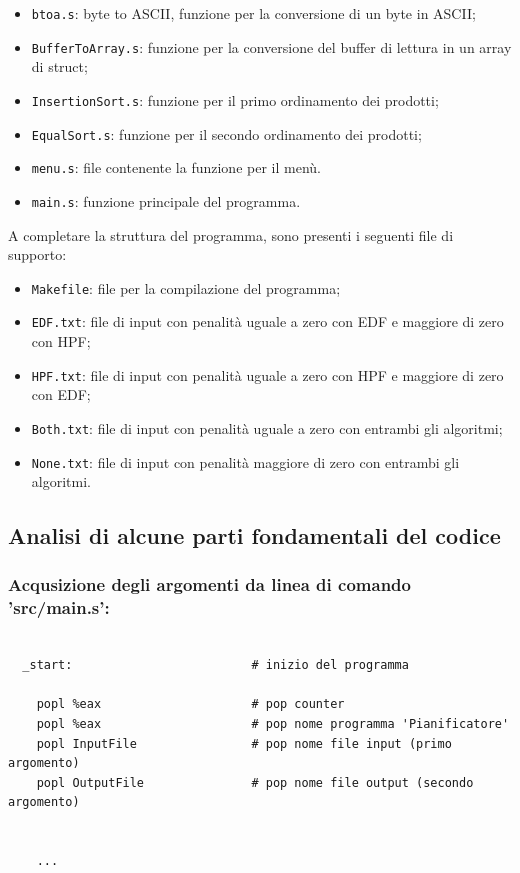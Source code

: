 \documentclass[a4paper]{report}
\begin{document}
\begin{itemize}
  \item \texttt{btoa.s}: byte to ASCII, funzione per la conversione di un byte in ASCII;
  \item \texttt{BufferToArray.s}: funzione per la conversione del buffer di lettura in un array di struct;
  \item \texttt{InsertionSort.s}: funzione per il primo ordinamento dei prodotti;
  \item \texttt{EqualSort.s}: funzione per il secondo ordinamento dei prodotti;
  \item \texttt{menu.s}: file contenente la funzione per il menù.
  \item \texttt{main.s}: funzione principale del programma.
\end{itemize}

A completare la struttura del programma, sono presenti i seguenti file di supporto:
\begin{itemize}
  \item \texttt{Makefile}: file per la compilazione del programma;
  \item \texttt{EDF.txt}: file di input con penalità uguale a zero con EDF e maggiore di zero con HPF;
  \item \texttt{HPF.txt}: file di input con penalità uguale a zero con HPF e maggiore di zero con EDF;
  \item \texttt{Both.txt}: file di input con penalità uguale a zero con entrambi gli algoritmi;
  \item \texttt{None.txt}: file di input con penalità maggiore di zero con entrambi gli algoritmi.
\end{itemize}

\subsection{Analisi di alcune parti fondamentali del codice}

\subsubsection{Acqusizione degli argomenti da linea di comando 'src/main.s':}
\begin{lstlisting}[firstnumber=38]

  _start:                         # inizio del programma   
    
    popl %eax                     # pop counter
    popl %eax                     # pop nome programma 'Pianificatore'
    popl InputFile                # pop nome file input (primo argomento)
    popl OutputFile               # pop nome file output (secondo argomento)

    
    ...
    
\end{lstlisting}
     
\end{document}
